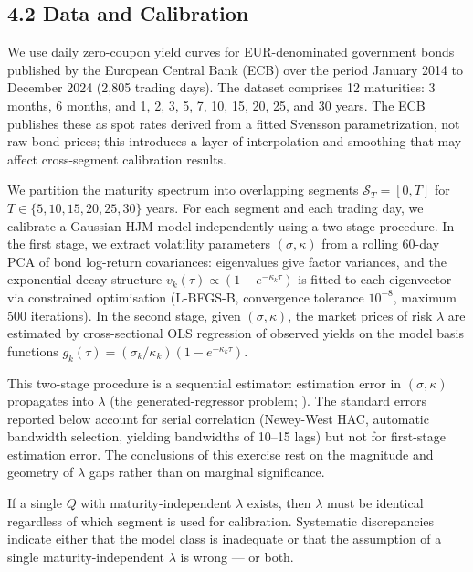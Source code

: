 \documentclass[
]{article}
\begin{document}
\subsection{4.2 Data and Calibration}\label{data-and-calibration}

We use daily zero-coupon yield curves for EUR-denominated government
bonds published by the European Central Bank (ECB) over the period
January 2014 to December 2024 (2,805 trading days). The dataset
comprises 12 maturities: 3 months, 6 months, and 1, 2, 3, 5, 7, 10, 15,
20, 25, and 30 years. The ECB publishes these as spot rates derived from
a fitted Svensson parametrization, not raw bond prices; this introduces
a layer of interpolation and smoothing that may affect cross-segment
calibration results.

We partition the maturity spectrum into overlapping segments
\(\mathcal{S}_T = [0, T]\) for \(T \in \{5, 10, 15, 20, 25, 30\}\)
years. For each segment and each trading day, we calibrate a Gaussian
HJM model independently using a two-stage procedure. In the first stage,
we extract volatility parameters \((\sigma, \kappa)\) from a rolling
60-day PCA of bond log-return covariances: eigenvalues give factor
variances, and the exponential decay structure
\(v_k(\tau) \propto (1 - e^{-\kappa_k \tau})\) is fitted to each
eigenvector via constrained optimisation (L-BFGS-B, convergence
tolerance \(10^{-8}\), maximum 500 iterations). In the second stage,
given \((\sigma, \kappa)\), the market prices of risk \(\lambda\) are
estimated by cross-sectional OLS regression of observed yields on the
model basis functions
\(g_k(\tau) = (\sigma_k / \kappa_k)(1 - e^{-\kappa_k \tau})\).

This two-stage procedure is a sequential estimator: estimation error in
\((\sigma, \kappa)\) propagates into \(\lambda\) (the
generated-regressor problem; \citealt{Pagan1984}). The standard errors reported
below account for serial correlation (Newey-West HAC, automatic
bandwidth selection, yielding bandwidths of 10--15 lags) but not for
first-stage estimation error. The conclusions of this exercise rest on
the magnitude and geometry of \(\lambda\) gaps rather than on marginal
significance.

If a single \(Q\) with maturity-independent \(\lambda\) exists, then
\(\lambda\) must be identical regardless of which segment is used for
calibration. Systematic discrepancies indicate either that the model
class is inadequate or that the assumption of a single
maturity-independent \(\lambda\) is wrong --- or both.
\end{document}
